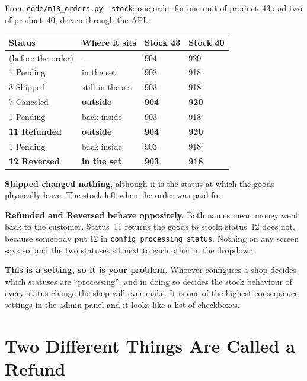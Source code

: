\begin{measured}
From \texttt{code/m18\_orders.py --stock}: one order for one unit of product~43
and two of product~40, driven through the API.

\begin{longtable}{@{}L{3.4cm}L{6.0cm}L{2.0cm}L{2.0cm}@{}}
\toprule
{}
\textbf{Status} & \textbf{Where it sits} & \textbf{Stock 43} &
\textbf{Stock 40} \\
\midrule
\endhead
(before the order) & --- & 904 & 920 \\
1 Pending & in the set & 903 & 918 \\
3 Shipped & still in the set & 903 & 918 \\
7 Canceled & \textbf{outside} & \textbf{904} & \textbf{920} \\
1 Pending & back inside & 903 & 918 \\
\textbf{11 Refunded} & \textbf{outside} & \textbf{904} & \textbf{920} \\
1 Pending & back inside & 903 & 918 \\
\textbf{12 Reversed} & \textbf{in the set} & \textbf{903} & \textbf{918} \\
\bottomrule
\end{longtable}

\smallskip
\textbf{Shipped changed nothing}, although it is the status at which the goods
physically leave. The stock left when the order was paid for.

\smallskip
\textbf{Refunded and Reversed behave oppositely.} Both names mean money went
back to the customer. Status~11 returns the goods to stock; status~12 does not,
because somebody put 12 in \texttt{config\_processing\_status}. Nothing on any
screen says so, and the two statuses sit next to each other in the dropdown.

\smallskip
\textbf{This is a setting, so it is your problem.} Whoever configures a shop
decides which statuses are ``processing'', and in doing so decides the stock
behaviour of every status change the shop will ever make. It is one of the
highest-consequence settings in the admin panel and it looks like a list of
checkboxes.
\end{measured}

\section{Two Different Things Are Called a Refund}

